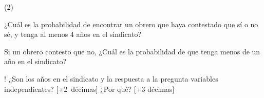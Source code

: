 \documentclass{cdplf-prueba}
\begin{document}
\begin{desarrollo}[height=6cm]
\end{desarrollo}

\begin{tasks}[label={\tcbox[colback=black!60, colframe=black!60, coltext=white, on line, boxsep=0pt, left=3pt, right=3pt, top=2pt, bottom=2pt]{\sffamily\bfseries\Alph*}},
    item-indent=1.2cm,column-sep=20pt,label-offset=0.3cm,label-width=15pt,after-item-skip=10pt](2)
    \task \raggedright ¿Cuál es la probabilidad de encontrar un obrero que haya contestado que sí o no sé, 
    y tenga al menos 4 años en el sindicato?
    \vspace{5pt}\begin{respuesta}[height=1.5cm]\end{respuesta}
    \task \raggedright Si un obrero contesto que no, ¿Cuál es la probabilidad de que 
    tenga menos de un año en el sindicato?
    \vspace{5pt}\begin{respuesta}[height=1.5cm]\end{respuesta}
    \task! ¿Son los años en el sindicato y la respuesta a la pregunta 
    variables independientes? \mbox{[+2 décimas]} ¿Por qué? [+3 décimas] 
    \vspace{5pt}\begin{respuesta}[height=2.5cm]\end{respuesta}
    
\end{tasks}
\end{document}

